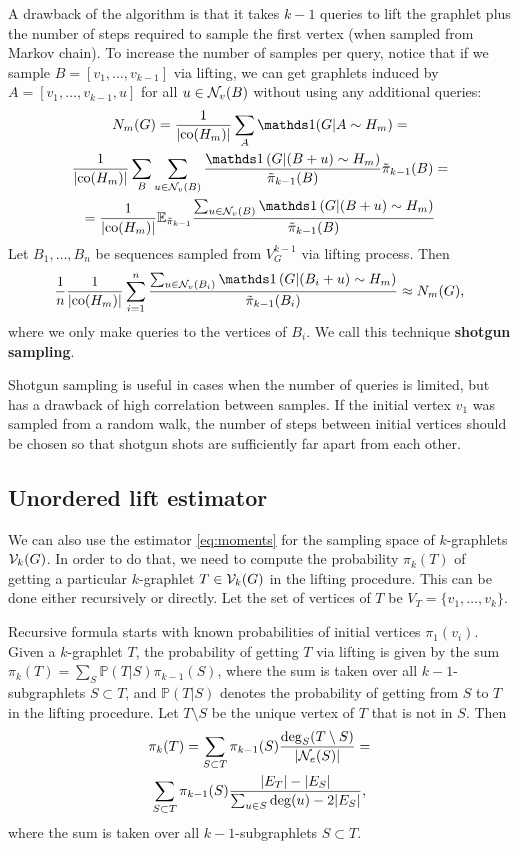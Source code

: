 	A drawback of the algorithm is that it takes $k-1$ queries to lift the graphlet plus the number of steps required to sample the first vertex (when sampled from Markov chain). 
	To increase the number of samples per query, notice that if we sample $B = [v_1, \ldots, v_{k-1}]$ via lifting, we can get graphlets induced by $A = [v_1,\ldots, v_{k-1},u]$ for all $u \in \mathcal{N}_v(B)$ without using any additional queries:
	\begin{multline*}
	    N_m(G) = \frac{1}{|\co(H_m)|}\sum_{A} \ind(G|A \sim H_m) =\\
	    \frac{1}{|\co(H_m)|}\sum_{B}\sum_{u\in \cN_v(B)} \frac{\ind\left(G|(B+u) \sim H_m\right)}{\tilde\pi_{k-1}(B)} \tilde\pi_{k-1}(B) = \\
	    =\frac{1}{|\co(H_m)|} \E_{\tilde\pi_{k-1}} \frac{\sum_{u\in \cN_v(B)} \ind\left(G|(B+u) \sim H_m\right)}{\tilde\pi_{k-1}(B)}
	\end{multline*}
	Let $B_1,\ldots,B_n$ be sequences sampled from $V^{k-1}_G$ via lifting process.
	Then
	\begin{equation*}
	    \frac{1}{n}\frac{1}{|\co(H_m)|}\sum_{i=1}^n \frac{\sum_{u\in \cN_v(B_i)} \ind\left(G|(B_i+u)\sim H_m\right)}{\tilde\pi_{k-1}(B_i)} \approx N_m(G),
	\end{equation*}
	where we only make queries to the vertices of $B_i$.
	We call this technique \textbf{shotgun sampling}.
	
	Shotgun sampling is useful in cases when the number of queries is limited, but has a drawback of high correlation between samples.
	If the initial vertex $v_1$ was sampled from a random walk, the number of steps between initial vertices should be chosen so that shotgun shots are sufficiently far apart from each other.
	
	\subsection{Unordered lift estimator}
	
	We can also use the estimator \eqref{eq:moments} for the sampling space of $k$-graphlets $\mathcal{V}_k(G)$.
	In order to do that, we need to compute the probability $\pi_k(T)$ of getting a particular $k$-graphlet $T \in \mathcal{V}_k(G)$ in the lifting procedure.
	This can be done either recursively or directly. 
	Let the set of vertices of $T$ be $V_T=\{v_1,\ldots,v_k\}$.
	
	Recursive formula starts with known probabilities of initial vertices $\pi_1(v_i)$.
	Given a $k$-graphlet $T$, the probability of getting $T$ via lifting is given by the sum $\pi_k(T) = \sum_S \mathbb{P}(T|S) \pi_{k-1}(S)$, where the sum is taken over all $k-1$-subgraphlets $S\subset T$, and $\mathbb{P}(T|S)$ denotes the probability of getting from $S$ to $T$ in the lifting procedure.
	Let $T\setminus S$ be the unique vertex of $T$ that is not in $S$.
	Then
	\begin{multline*}
	\label{eq:recursive}
		\pi_{k}(T) = \sum_{S\subset T} \pi_{k-1}(S) \frac{\mathrm{deg}_S (T\setminus S)}{|\mathcal{N}_e(S)|} = \\
		\sum_{S\subset T} \pi_{k-1}(S) \frac{|E_T| - |E_S|}
		{\sum_{u\in S} \mathrm{deg}(u) - 2|E_S|},
	\end{multline*}
	where the sum is taken over all $k-1$-subgraphlets $S\subset T$.
	
